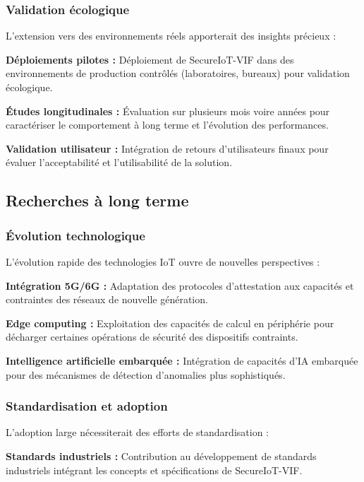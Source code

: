 \subsubsection{Validation écologique}

L'extension vers des environnements réels apporterait des insights précieux :

\textbf{Déploiements pilotes :} Déploiement de SecureIoT-VIF dans des environnements de production contrôlés (laboratoires, bureaux) pour validation écologique.

\textbf{Études longitudinales :} Évaluation sur plusieurs mois voire années pour caractériser le comportement à long terme et l'évolution des performances.

\textbf{Validation utilisateur :} Intégration de retours d'utilisateurs finaux pour évaluer l'acceptabilité et l'utilisabilité de la solution.

\subsection{Recherches à long terme}

\subsubsection{Évolution technologique}

L'évolution rapide des technologies IoT ouvre de nouvelles perspectives :

\textbf{Intégration 5G/6G :} Adaptation des protocoles d'attestation aux capacités et contraintes des réseaux de nouvelle génération.

\textbf{Edge computing :} Exploitation des capacités de calcul en périphérie pour décharger certaines opérations de sécurité des dispositifs contraints.

\textbf{Intelligence artificielle embarquée :} Intégration de capacités d'IA embarquée pour des mécanismes de détection d'anomalies plus sophistiqués.

\subsubsection{Standardisation et adoption}

L'adoption large nécessiterait des efforts de standardisation :

\textbf{Standards industriels :} Contribution au développement de standards industriels intégrant les concepts et spécifications de SecureIoT-VIF.

